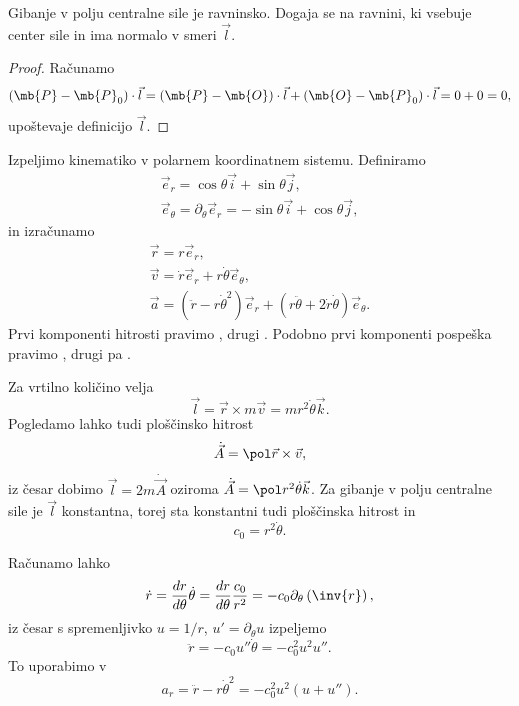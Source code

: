 
\begin{trditev}
  Gibanje v polju centralne sile je ravninsko.
  Dogaja se na ravnini, ki vsebuje center sile in ima normalo v smeri $\vec{l}$.
\end{trditev}

\begin{proof}
  Računamo
  \[
	(\mb{P} - \mb{P}_0) \cdot \vec{l} = (\mb{P} -\mb{O}) \cdot \vec{l} + (\mb{O}
	- \mb{P}_0) \cdot \vec{l} = 0 + 0 = 0,
  \]
  upoštevaje definicijo $\vec{l}$.
\end{proof}


Izpeljimo kinematiko v polarnem koordinatnem sistemu.
Definiramo
\begin{gather*}
  \vec{e}_r = \cos \theta \vec{i} + \sin \theta \vec{j}, \\
  \vec{e}_\theta = \partial_\theta \vec{e}_r = - \sin \theta \vec{i} + \cos
  \theta \vec{j},
\end{gather*}
in izračunamo
\begin{gather*}
  \vec{r} = r \vec{e}_r, \\
  \vec{v} = \dot{r} \vec{e}_r + r \dot{\theta} \vec{e}_\theta, \\
  \vec{a} = (\ddot{r} - r \dot{\theta}^2) \vec{e}_r + (r \ddot{\theta} + 2
  \dot{r} \dot{\theta}) \vec{e}_\theta.
\end{gather*}
Prvi komponenti hitrosti pravimo , drugi .
Podobno prvi komponenti pospeška pravimo , drugi pa
.

Za vrtilno količino velja
\[
  \vec{l} = \vec{r} \times m \vec{v} = m r^2 \dot{\theta} \vec{k}.
\]
Pogledamo lahko tudi ploščinsko hitrost
\[
  \dot{\vec{A}} = \pol \vec{r} \times \vec{v},
\]
iz česar dobimo $\vec{l} = 2 m \dot{\vec{A}}$ oziroma $\dot{\vec{A}} = \pol r^2
\dot{\theta} \vec{k}$.
Za gibanje v polju centralne sile je $\vec{l}$ konstantna, torej sta konstantni
tudi ploščinska hitrost in 
\[
  c_0 = r^2 \dot{\theta}.
\]


Računamo lahko
\[
  \dot{r} = \frac{dr}{d\theta} \dot{\theta} = \frac{dr}{d\theta} \frac{c_0}{r^2}
  = - c_0 \partial_\theta \left( \inv{r} \right),
\]
iz česar s spremenljivko $u = 1/r$, $u' = \partial_\theta u$ izpeljemo
\[
  \ddot{r} = - c_0 u'' \dot{\theta} = -c_0^2 u^2 u''.
\]
To uporabimo v 
\[
  a_r = \ddot{r} - r \dot{\theta}^2 = -c_0^2 u^2 (u + u'').
\]

